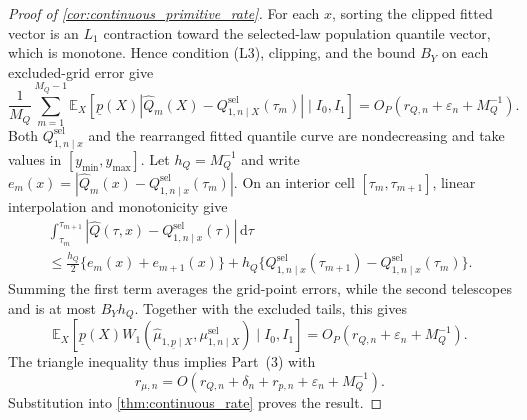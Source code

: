 \begin{proof}[Proof of \cref{cor:continuous_primitive_rate}]
For each $x$, sorting the clipped fitted vector is an $L_1$ contraction toward the selected-law population quantile vector, which is monotone. Hence condition (L3), clipping, and the bound $B_Y$ on each excluded-grid error give
\[
    \frac1{M_Q}\sum_{m=1}^{M_Q-1}
    \mathbb E_X\!\left[
      \underline p(X)
      |\widehat Q_m(X)-Q^{\mathrm{sel}}_{1,n\mid X}(\tau_m)|
      \mid I_0,I_1\right]
    =O_P(r_{Q,n}+\varepsilon_n+M_Q^{-1}).
\]
Both $Q^{\mathrm{sel}}_{1,n\mid x}$ and the rearranged fitted quantile curve are nondecreasing and take values in $[y_{\min},y_{\max}]$. Let $h_Q=M_Q^{-1}$ and write $e_m(x)=|\widehat Q_m(x)-Q^{\mathrm{sel}}_{1,n\mid x}(\tau_m)|$. On an interior cell $[\tau_m,\tau_{m+1}]$, linear interpolation and monotonicity give
\begin{multline*}
  \int_{\tau_m}^{\tau_{m+1}}
  |\widehat Q(\tau,x)-Q^{\mathrm{sel}}_{1,n\mid x}(\tau)|\,\mathrm d\tau \\
  \leqslant \frac{h_Q}{2}\{e_m(x)+e_{m+1}(x)\}
  +h_Q\{Q^{\mathrm{sel}}_{1,n\mid x}(\tau_{m+1})-Q^{\mathrm{sel}}_{1,n\mid x}(\tau_m)\}.
\end{multline*}
Summing the first term averages the grid-point errors, while the second telescopes and is at most $B_Yh_Q$. Together with the excluded tails, this gives
\[
    \mathbb E_X\!\left[
      \underline p(X)W_1(\hat\mu_{1,\underline p\mid X},
      \mu^{\mathrm{sel}}_{1,n\mid X})\mid I_0,I_1\right]
    =O_P(r_{Q,n}+\varepsilon_n+M_Q^{-1}).
\]
The triangle inequality thus implies Part~(3) with
\[
    r_{\mu,n}=O(r_{Q,n}+\delta_n+r_{p,n}+\varepsilon_n+M_Q^{-1}).
\]
Substitution into \cref{thm:continuous_rate} proves the result.
\end{proof}

